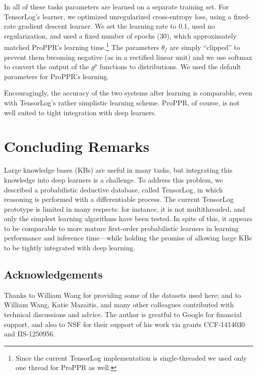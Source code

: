 \documentclass{article}
\begin{document}
In all of these tasks parameters are learned on a separate training
set.  For TensorLog's learner, we optimized unregularized
cross-entropy loss, using a fixed-rate gradient descent learner.  We
set the learning rate to 0.1, used no regularization, and used a fixed
number of epochs (30), which approximately matched ProPPR's learning
time.\footnote{Since the current TensorLog implementation is
  single-threaded we used only one thread for ProPPR as well.}  The
parameters $\theta_f$ are simply ``clipped'' to prevent them becoming
negative (as in a rectified linear unit) and we use softmax to convert
the output of the $g^p$ functions to distributions.  We used the
default parameters for ProPPR's learning.

Encouragingly, the accuracy of the two systems after learning is
comparable, even with TensorLog's rather simplistic learning scheme.
ProPPR, of course, is not well suited to tight integration with deep
learners.

\section{Concluding Remarks}

Large knowledge bases (KBs) are useful in many tasks, but integrating
this knowledge into deep learners is a challenge.  To address this
problem, we described a probabilistic deductive database, called
TensorLog, in which reasoning is performed with a differentiable
process.  The current TensorLog prototype is limited in many respects:
for instance, it is not multithreaded, and only the simplest learning
algorithms have been tested.  In spite of this, it appears to be
comparable to more mature first-order probabilistic learners in
learning performance and inference time---while holding the promise of
allowing large KBs to be tightly integrated with deep learning.

\subsection*{Acknowledgements}

Thanks to William Wang for providing some of the datasets used here;
and to William Wang, Katie Mazaitis, and many other colleagues
contributed with technical discussions and advice.  The author is
greatful to Google for financial support, and also to NSF for their
support of his work via grants CCF-1414030 and IIS-1250956.

\newpage


  
% 
\end{document}
